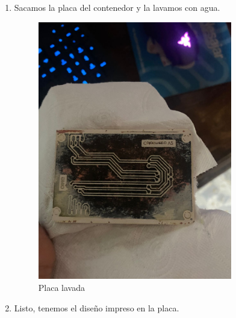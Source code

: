 \documentclass[12pt]{report}
\begin{document}
\begin{enumerate}
  \item Sacamos la placa del contenedor y la lavamos con agua.
  \begin{figure}[H]
      \centering
      \includegraphics[width=0.8\textwidth]{screenshots/PlacaParaLimpear.jpeg}
      \caption{Placa lavada}
      \label{fig:placaLavada}
  \end{figure}
  
  \item Listo, tenemos el diseño impreso en la placa.
\end{enumerate}
\end{document}
